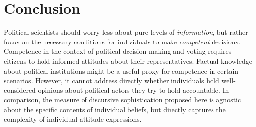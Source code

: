 \documentclass[12pt]{article}
\begin{document}




\section*{Conclusion}

Political scientists should worry less about pure levels of \textit{information}, but rather focus on the necessary conditions for individuals to make \textit{competent} decisions. Competence in the context of political decision-making and voting requires citizens to hold informed attitudes about their representatives. Factual knowledge about political institutions might be a useful proxy for competence in certain scenarios. However, it cannot address directly whether individuals hold well-considered opinions about political actors they try to hold accountable. In comparison, the measure of discursive sophistication proposed here is agnostic about the specific contents of individual beliefs, but directly captures the complexity of individual attitude expressions.
\end{document}
